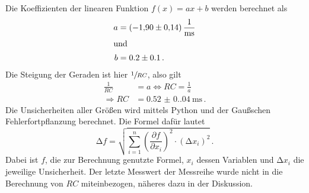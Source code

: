 Die Koeffizienten der linearen Funktion $f(x)=ax+b$ werden berechnet als
\begin{align*}
    a&=\qty{-1.9(0.14)}{\per\milli\second}\\
    \intertext{und}
    b&=0.2\pm0.1\,.
\end{align*}
Die Steigung der Geraden ist hier $\sfrac{1}{RC}$, also gilt
\begin{align*}
    \frac{1}{RC}&=a\Leftrightarrow RC=\frac{1}{a}\\
    \Rightarrow RC&=\qty{0.52(0.04)}{\milli\second}\,.
\end{align*}
Die Unsicherheiten aller Größen wird mittels Python und der Gaußschen 
Fehlerfortpflanzung berechnet. Die Formel dafür lautet
\begin{equation}
    \increment f= \sqrt{\sum_{i=1}^n\left(\frac{\partial f}{\partial x_i}
    \right)^2\cdot (\increment x_i)^2}\,.
    \end{equation}
Dabei ist $f$, die zur Berechnung genutzte Formel, $x_i$ dessen
Variablen und $\increment x_i$ die jeweilige Unsicherheit.
Der letzte Messwert der Messreihe wurde nicht in die Berechnung von $RC$ miteinbezogen,
näheres dazu in der Diskussion.
